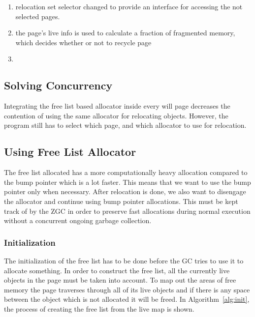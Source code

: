 \begin{enumerate}
    \item relocation set selector changed to provide an interface for accessing the not selected pages.
    \item the page's live info is used to calculate a fraction of fragmented memory, which decides whether or not to recycle page
    \item 
\end{enumerate}

\subsection{Solving Concurrency}
Integrating the free list based allocator inside every will page decreases the contention of using the same allocator for relocating objects. However, the program still has to select which page, and which allocator to use for relocation.

\subsection{Using Free List Allocator}
The free list allocated has a more computationally heavy allocation compared to the bump pointer which is a lot faster. This means that we want to use the bump pointer only when necessary. After relocation is done, we also want to disengage the allocator and continue using bump pointer allocations. This must be kept track of by the ZGC in order to preserve fast allocations during normal execution without a concurrent ongoing garbage collection.
\subsubsection{Initialization}
The initialization of the free list has to be done before the GC tries to use it to allocate something. In order to construct the free list, all the currently live objects in the page must be taken into account. To map out the areas of free memory the page traverses through all of its live objects and if there is any space between the object which is not allocated it will be freed. In Algorithm~\ref{alg:init}, the process of creating the free list from the live map is shown.

